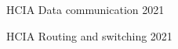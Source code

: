 
\begin{cvhonors}


 \cvhonor
    {HCIA} %
    {Data communication} %
    {} %
    {2021} %

 \cvhonor
    {HCIA} %
    {Routing and switching } %
    {} %
    {2021} %


\end{cvhonors}
